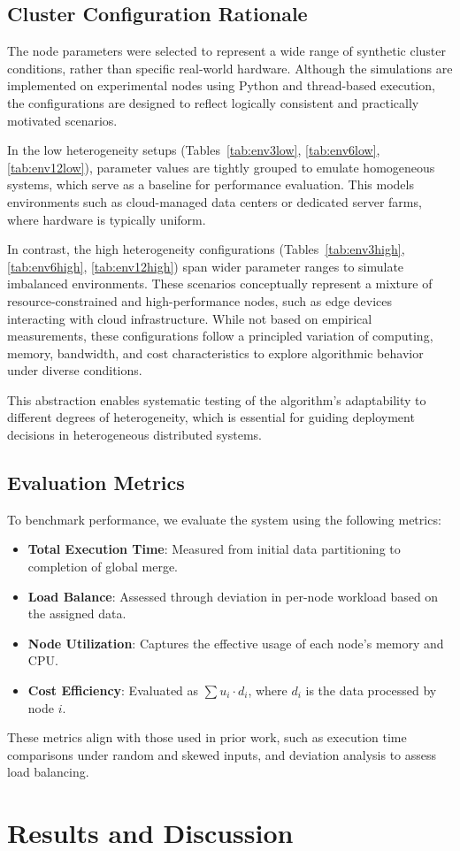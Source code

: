 \documentclass[]{interact}
\theoremstyle{plain}
\theoremstyle{definition}
\theoremstyle{remark}
\begin{document}
\subsection{Cluster Configuration Rationale}

The node parameters were selected to represent a wide range of synthetic cluster conditions, rather than specific real-world hardware. Although the simulations are implemented on experimental nodes using Python and thread-based execution, the configurations are designed to reflect logically consistent and practically motivated scenarios.

In the low heterogeneity setups (Tables~\ref{tab:env3low}, \ref{tab:env6low}, \ref{tab:env12low}), parameter values are tightly grouped to emulate homogeneous systems, which serve as a baseline for performance evaluation. This models environments such as cloud-managed data centers or dedicated server farms, where hardware is typically uniform.

In contrast, the high heterogeneity configurations (Tables~\ref{tab:env3high}, \ref{tab:env6high}, \ref{tab:env12high}) span wider parameter ranges to simulate imbalanced environments. These scenarios conceptually represent a mixture of resource-constrained and high-performance nodes, such as edge devices interacting with cloud infrastructure. While not based on empirical measurements, these configurations follow a principled variation of computing, memory, bandwidth, and cost characteristics to explore algorithmic behavior under diverse conditions.

This abstraction enables systematic testing of the algorithm's adaptability to different degrees of heterogeneity, which is essential for guiding deployment decisions in heterogeneous distributed systems.


\subsection{Evaluation Metrics}
To benchmark performance, we evaluate the system using the following metrics:
\begin{itemize}
\item \textbf{Total Execution Time}: Measured from initial data partitioning to completion of global merge.
\item \textbf{Load Balance}: Assessed through deviation in per-node workload based on the assigned data.
\item \textbf{Node Utilization}: Captures the effective usage of each node’s memory and CPU.
\item \textbf{Cost Efficiency}: Evaluated as $\sum u_i \cdot d_i$, where $d_i$ is the data processed by node $i$.
\end{itemize}

These metrics align with those used in prior work, such as execution time comparisons under random and skewed inputs, and deviation analysis to assess load balancing.


\section{Results and Discussion}
\end{document}
